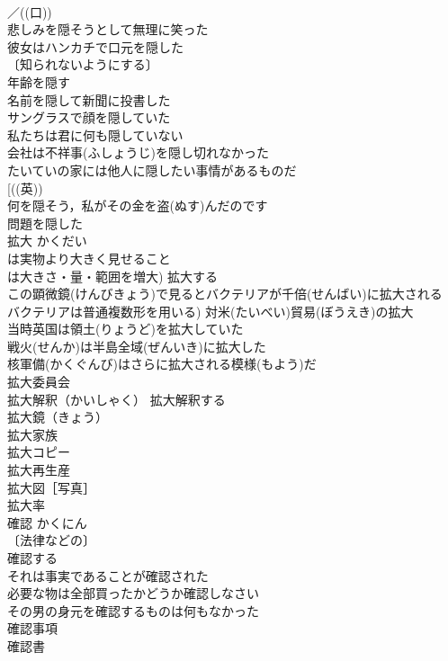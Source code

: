 \documentclass[8pt]{extreport}
\begin{document}
\begin{CJK}{UTF8}{min}
\\	／((口))
\\	悲しみを隠そうとして無理に笑った 
\\	彼女はハンカチで口元を隠した 
\\	〔知られないようにする〕
\\	年齢を隠す 
\\	名前を隠して新聞に投書した 
\\	サングラスで顔を隠していた 
\\	私たちは君に何も隠していない 
\\	会社は不祥事(ふしょうじ)を隠し切れなかった 
\\	たいていの家には他人に隠したい事情があるものだ 
\\	[((英)) 
\\	何を隠そう，私がその金を盗(ぬす)んだのです 
\\	問題を隠した 
\\	拡大	かくだい	
\\	は実物より大きく見せること
\\	は大きさ・量・範囲を増大) 拡大する 
\\	この顕微鏡(けんびきょう)で見るとバクテリアが千倍(せんばい)に拡大される 
\\	バクテリアは普通複数形を用いる) 対米(たいべい)貿易(ぼうえき)の拡大 
\\	当時英国は領土(りょうど)を拡大していた 
\\	戦火(せんか)は半島全域(ぜんいき)に拡大した 
\\	核軍備(かくぐんび)はさらに拡大される模様(もよう)だ 
\\	拡大委員会 
\\	拡大解釈（かいしゃく） 拡大解釈する 
\\	拡大鏡（きょう） 
\\	拡大家族 
\\	拡大コピー 
\\	拡大再生産 
\\	拡大図［写真］ 
\\	拡大率 
\\	確認	かくにん	
\\	〔法律などの〕
\\	確認する 
\\	それは事実であることが確認された 
\\	必要な物は全部買ったかどうか確認しなさい 
\\	その男の身元を確認するものは何もなかった 
\\	確認事項 
\\	確認書 

\end{CJK}
\end{document}
